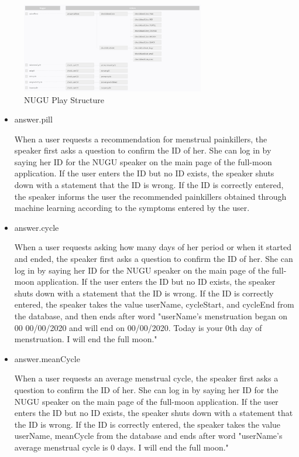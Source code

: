 \documentclass[conference]{IEEEtran}
\begin{document}
\begin{itemize}
\begin{enumerate}
\begin{enumerate}
            \begin{figure}[ht]
\includegraphics[width=8cm, center]{NUGU_structure.PNG}
\caption{NUGU Play Structure}
\label{fig45}
\end{figure} 
            
            \begin{itemize}
                
                \item answer.pill
                
                \setlength{\parindent}{2ex} When a user requests a recommendation for menstrual painkillers, the speaker first asks a question to confirm the ID of her. She can log in by saying her ID for the NUGU speaker on the main page of the full-moon application. If the user enters the ID but no ID exists, the speaker shuts down with a statement that the ID is wrong. If the ID is correctly entered, the speaker informs the user the recommended painkillers obtained through machine learning according to the symptoms entered by the user.
                
                \item answer.cycle
                
                \setlength{\parindent}{2ex} When a user requests asking how many days of her period or when it started and ended, the speaker first asks a question to confirm the ID of her. She can log in by saying her ID for the NUGU speaker on the main page of the full-moon application. If the user enters the ID but no ID exists, the speaker shuts down with a statement that the ID is wrong. If the ID is correctly entered, the speaker takes the value userName, cycleStart, and cycleEnd from the database, and then ends after word "userName's menstruation began on 00 00/00/2020 and will end on 00/00/2020. Today is your 0th day of menstruation. I will end the full moon."
                
                \item answer.meanCycle
                
                \setlength{\parindent}{2ex} When a user requests an average menstrual cycle, the speaker first asks a question to confirm the ID of her. She can log in by saying her ID for the NUGU speaker on the main page of the full-moon application. If the user enters the ID but no ID exists, the speaker shuts down with a statement that the ID is wrong. If the ID is correctly entered, the  speaker takes the value userName, meanCycle from the database and ends after word "userName's average menstrual cycle is 0 days. I will end the full moon."
                

\end{itemize}
\end{enumerate}
\end{enumerate}
\end{itemize}
\end{document}
